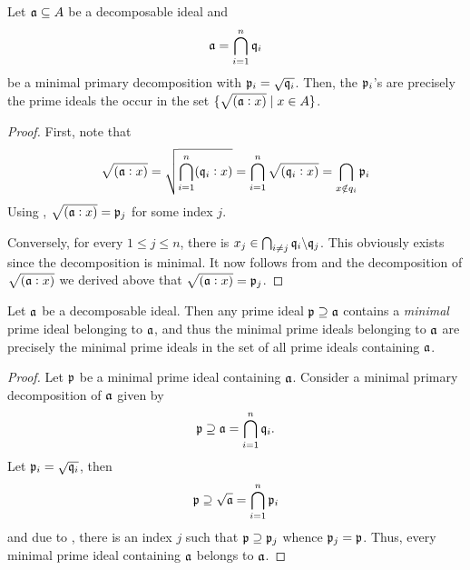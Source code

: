 \begin{theorem}
    Let $\mathfrak a\subseteq A$ be a decomposable ideal and 
    \begin{equation*}
        \mathfrak a = \bigcap_{i = 1}^n\mathfrak q_i
    \end{equation*}
    be a minimal primary decomposition with $\mathfrak p_i = \sqrt{\mathfrak q_i}$. Then, the $\mathfrak p_i$'s are precisely the prime ideals the occur in the set $\{\sqrt{(\mathfrak a: x)}\mid x\in A\}$.
\end{theorem}
\begin{proof}
    First, note that 
    \begin{equation*}
        \sqrt{(\mathfrak a: x)} = \sqrt{\bigcap_{i = 1}^n(\mathfrak q_i: x)} = \bigcap_{i = 1}^n\sqrt{(\mathfrak q_i: x)} = \bigcap_{x\notin q_i}\mathfrak p_i
    \end{equation*}
    Using , $\sqrt{(\mathfrak a : x)} = \mathfrak p_j$ for some index $j$. 

    Conversely, for every $1\le j\le n$, there is $x_j\in\bigcap_{i\ne j}\mathfrak q_i\backslash\mathfrak q_j$. This obviously exists since the decomposition is minimal. It now follows from  and the decomposition of $\sqrt{(\mathfrak a: x)}$ we derived above that $\sqrt{(\mathfrak a : x)} = \mathfrak p_j$.
\end{proof}

\begin{proposition}
    Let $\mathfrak a$ be a decomposable ideal. Then any prime ideal $\mathfrak p\supseteq\mathfrak a$ contains a \textit{minimal} prime ideal belonging to $\mathfrak a$, and thus the minimal prime ideals belonging to $\mathfrak a$ are precisely the minimal prime ideals in the set of all prime ideals containing $\mathfrak a$.
\end{proposition}
\begin{proof}
    Let $\mathfrak p$ be a minimal prime ideal containing $\mathfrak a$. Consider a minimal primary decomposition of $\mathfrak a$ given by 
    \begin{equation*}
        \mathfrak p\supseteq\mathfrak a = \bigcap_{i = 1}^n\mathfrak q_i.
    \end{equation*}
    Let $\mathfrak p_i = \sqrt{\mathfrak q_i}$, then 
    \begin{equation*}
        \mathfrak p\supseteq\sqrt{\mathfrak a} = \bigcap_{i = 1}^n\mathfrak p_i
    \end{equation*}
    and due to , there is an index $j$ such that $\mathfrak p\supseteq\mathfrak p_j$ whence $\mathfrak p_j = \mathfrak p$. Thus, every minimal prime ideal containing $\mathfrak a$ belongs to $\mathfrak a$.
\end{proof}

